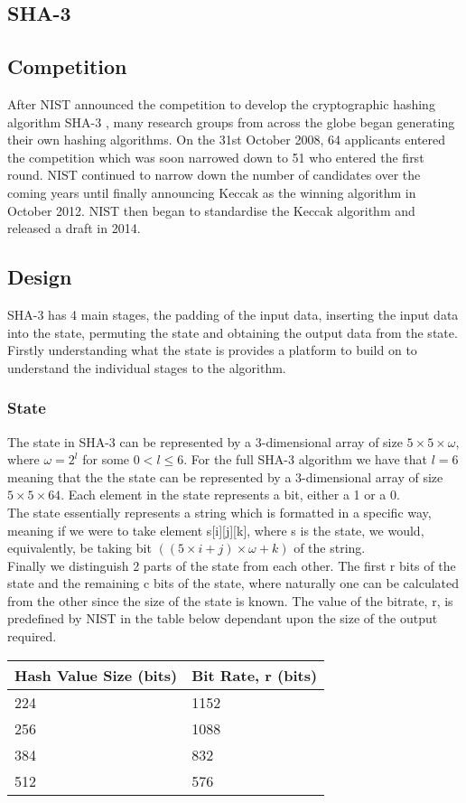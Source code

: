 \subsection{SHA-3}
\subsection{Competition}
After NIST announced the competition to develop the cryptographic hashing algorithm SHA-3 \cite{SHA3comp}, many research groups from across the globe began generating their own hashing algorithms. On the 31st October 2008, 64 applicants entered the competition which was soon narrowed down to 51 who entered the first round. NIST continued to narrow down the number of candidates over the coming years until finally announcing Keccak as the winning algorithm in October 2012. NIST then began to standardise the Keccak algorithm and released a draft in 2014.
\subsection{Design}
SHA-3 has 4 main stages, the padding of the input data, inserting the input data into the state, permuting the state and obtaining the output  data from the state. Firstly understanding what the state is provides a platform to build on to understand the individual stages to the algorithm.
\subsubsection{State}
The state in SHA-3 can be represented by a 3-dimensional array of size $ 5 \times 5 \times \omega $, where $ \omega = 2^{l} $ for some $ 0 < l \leq 6 $. For the full SHA-3 algorithm we have that $ l = 6 $ meaning that the the state can be represented by a 3-dimensional array of size $ 5 \times 5 \times 64 $. Each element in the state represents a bit, either a 1 or a 0.
\vspace{5 mm}\\
The state essentially represents a string which is formatted in a specific way, meaning if we were to take element s[i][j][k], where s is the state, we would, equivalently, be taking bit $( (5 \times i + j) \times \omega + k)$ of the string.
\vspace{5 mm}\\
Finally we distinguish 2 parts of the state from each other. The first r bits of the state and the remaining c bits of the state, where naturally one can be calculated from the other since the size of the state is known. The value of the bitrate, r, is predefined by NIST in the table below dependant upon the size of the output required.
\begin{center}
\begin{tabular}{| l | l |}
\hline
\textbf{Hash Value Size (bits)} & \textbf{Bit Rate, r (bits)} \\ \hline
224 & 1152 \\ \hline
256 & 1088 \\ \hline
384  & 832 \\ \hline
512  & 576 \\ \hline
\end{tabular}
\end{center}
